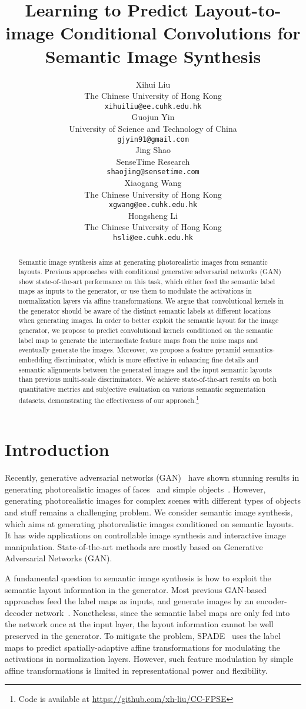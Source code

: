 \documentclass{article}
\title{Learning to Predict Layout-to-image Conditional Convolutions for Semantic Image Synthesis}
\author{
  Xihui Liu \\
  The Chinese University of Hong Kong \\
  \texttt{xihuiliu@ee.cuhk.edu.hk} \\
  \And
  Guojun Yin \\
  University of Science and Technology of China \\
  \texttt{gjyin91@gmail.com} \\
  \AND
  Jing Shao \\
  SenseTime Research \\
  \texttt{shaojing@sensetime.com} \\
  \And
  Xiaogang Wang \\
  The Chinese University of Hong Kong \\
  \texttt{xgwang@ee.cuhk.edu.hk} \\
  \And
  Hongsheng Li \\
  The Chinese University of Hong Kong \\
  \texttt{hsli@ee.cuhk.edu.hk} \\
}
\begin{document}
\maketitle
\begin{abstract}
  Semantic image synthesis aims at generating photorealistic images from semantic layouts. Previous approaches with conditional generative adversarial networks (GAN) show state-of-the-art performance on this task, which either feed the semantic label maps as inputs to the generator, or use them to modulate the activations in normalization layers via affine transformations. We argue that convolutional kernels in the generator should be aware of the distinct semantic labels at different locations when generating images. In order to better exploit the semantic layout for the image generator, we propose to predict convolutional kernels conditioned on the semantic label map to generate the intermediate feature maps from the noise maps and eventually generate the images. Moreover, we propose a feature pyramid semantics-embedding discriminator, which is more effective in enhancing fine details and semantic alignments between the generated images and the input semantic layouts than previous multi-scale discriminators. We achieve state-of-the-art results on both quantitative metrics and subjective evaluation on various semantic segmentation datasets, demonstrating the effectiveness of our approach.\footnote{Code is available at \href{https://github.com/xh-liu/CC-FPSE}{https://github.com/xh-liu/CC-FPSE}}
 \end{abstract}

\section{Introduction}


Recently, generative adversarial networks (GAN)~\cite{goodfellow2014gan} have shown stunning results in generating photorealistic images of faces~\cite{karras2017progressive,karras2018style} and simple objects~\cite{zhang2018self,brock2018large,lucic2019high}.
However, generating photorealistic images for complex scenes with different types of objects and stuff remains a challenging problem.
We consider semantic image synthesis, which aims at generating photorealistic images conditioned on semantic layouts.
It has wide applications on controllable image synthesis and interactive image manipulation.
State-of-the-art methods are mostly based on Generative Adversarial Networks (GAN).

A fundamental question to semantic image synthesis is how to exploit the semantic layout information in the generator. 
Most previous GAN-based approaches feed the label maps as inputs, and generate images by an encoder-decoder network~\cite{isola2017image,wang2018high,park2019semantic}.
Nonetheless, since the semantic label maps are only fed into the network once at the input layer, the layout information cannot be well preserved in the generator.
To mitigate the problem, SPADE~\cite{park2019semantic} uses the label maps to predict spatially-adaptive affine transformations for modulating the activations in normalization layers.
However, such feature modulation by simple affine transformations is limited in representational power and flexibility.
\end{document}
